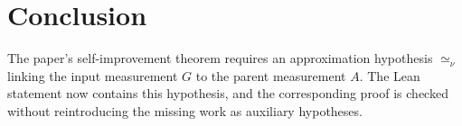 \documentclass{article}
\begin{document}
\section{Conclusion}

The paper's self-improvement theorem requires an approximation hypothesis
$\simeq_{\nu}$ linking the input measurement $G$ to the parent measurement
$A$.  The Lean statement now contains this hypothesis, and the corresponding
proof is checked without reintroducing the missing work as auxiliary
hypotheses.



\end{document}
